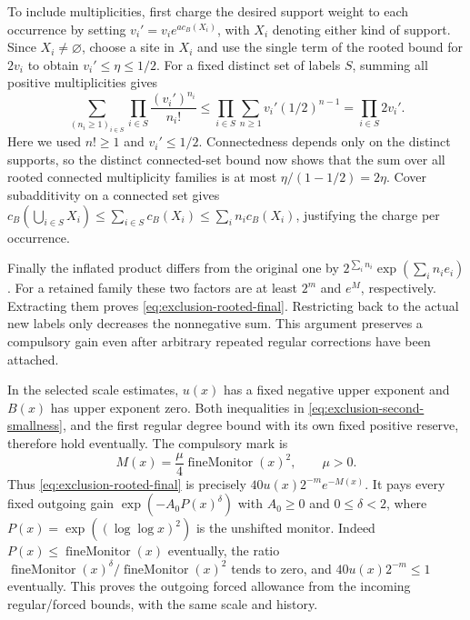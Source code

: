 To include multiplicities, first charge the desired support weight
to each occurrence by setting $v_i'=v_i e^{a c_B(X_i)}$, with $X_i$
denoting either kind of support. Since $X_i\ne\varnothing$, choose
a site in $X_i$ and use the single term of the rooted bound for
$2v_i$ to obtain $v_i'\le\eta\le1/2$. For a fixed distinct set of
labels $S$, summing all positive multiplicities gives
\[
 \sum_{(n_i\ge1)_{i\in S}}\prod_{i\in S}\frac{(v_i')^{n_i}}{n_i!}
       \le\prod_{i\in S}\sum_{n\ge1}v_i'(1/2)^{n-1}
       =\prod_{i\in S}2v_i'.
\]
Here we used $n!\ge1$ and $v_i'\le1/2$. Connectedness depends only
on the distinct supports, so the distinct connected-set bound now
shows that the sum over all rooted connected multiplicity families
is at most $\eta/(1-1/2)=2\eta$. Cover subadditivity on a connected
set gives
$c_B(\bigcup_{i\in S}X_i)\le\sum_{i\in S}c_B(X_i)
\le\sum_i n_i c_B(X_i)$, justifying the charge per occurrence.

Finally the inflated product differs from the original one by
$2^{\sum_i n_i}\exp(\sum_i n_i e_i)$. For a retained family these
two factors are at least $2^m$ and $e^M$, respectively. Extracting
them proves \eqref{eq:exclusion-rooted-final}. Restricting back to
the actual new labels only decreases the nonnegative sum. This
argument preserves a compulsory gain even after arbitrary repeated
regular corrections have been attached.

In the selected scale estimates, $u(x)$ has a fixed negative upper
exponent and $B(x)$ has upper exponent zero. Both inequalities in
\eqref{eq:exclusion-second-smallness}, and the first regular degree
bound with its own fixed positive reserve, therefore hold eventually.
The compulsory mark is
\[
                M(x)=\frac{\mu}{4}\operatorname{fineMonitor}(x)^2,
                            \qquad \mu>0.
\]
Thus \eqref{eq:exclusion-rooted-final} is precisely
$40u(x)2^{-m}e^{-M(x)}$. It pays every fixed outgoing gain
$\exp(-A_0 P(x)^\delta)$ with $A_0\ge0$ and $0\le\delta<2$,
where $P(x)=\exp((\log\log x)^2)$ is the unshifted monitor.
Indeed $P(x)\le\operatorname{fineMonitor}(x)$ eventually, the ratio
$\operatorname{fineMonitor}(x)^\delta/
\operatorname{fineMonitor}(x)^2$ tends to zero, and $40u(x)2^{-m}\le1$
eventually. This proves the outgoing forced allowance from the
incoming regular/forced bounds, with the same scale and history.
